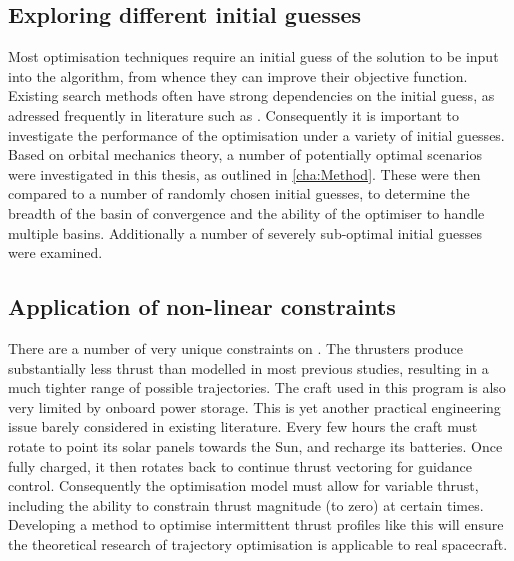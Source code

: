 \subsection{Exploring different initial guesses} \label{sub:Initial-guesses}

Most optimisation techniques require an initial guess of the solution to be input into the algorithm, from whence they can improve their objective function. Existing search methods often have strong dependencies on the initial guess, as adressed frequently in literature such as \textcite{Dachwald2005}. Consequently it is important to investigate the performance of the optimisation under a variety of initial guesses. Based on orbital mechanics theory, a number of potentially optimal scenarios were investigated in this thesis, as outlined in \autoref{cha:Method}. These were then compared to a number of randomly chosen initial guesses, to determine the breadth of the basin of convergence and the ability of the optimiser to handle multiple basins. Additionally a number of severely sub-optimal initial guesses were examined.

\subsection{Application of non-linear constraints} \label{sub:Model-non-linear-constraints}

There are a number of very unique constraints on \BW. The thrusters produce substantially less thrust than modelled in most previous studies, resulting in a much tighter range of possible trajectories. The craft used in this program is also very limited by onboard power storage. This is yet another practical engineering issue barely considered in existing literature. Every few hours the craft must rotate to point its solar panels towards the Sun, and recharge its batteries. Once fully charged, it then rotates back to continue thrust vectoring for guidance control. Consequently the optimisation model must allow for variable thrust, including the ability to constrain thrust magnitude (to zero) at certain times. Developing a method to optimise intermittent thrust profiles like this will ensure the theoretical research of trajectory optimisation is applicable to real spacecraft.

